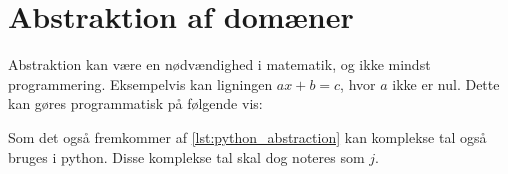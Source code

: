 \section{Abstraktion af domæner}
Abstraktion kan være en nødvændighed i matematik, og ikke mindst programmering.
Eksempelvis kan ligningen $ax+b=c$, hvor $a$ ikke er nul.
Dette kan gøres programmatisk på følgende vis:

Som det også fremkommer af \cref{lst:python_abstraction} kan komplekse tal også bruges i python.
Disse komplekse tal skal dog noteres som $j$.


